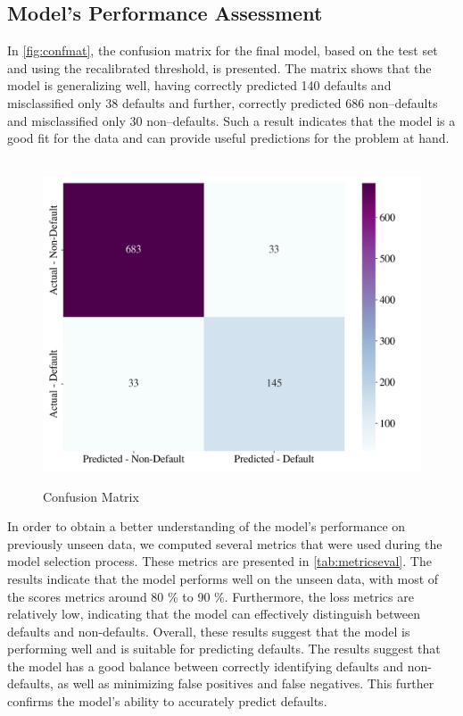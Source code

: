 \subsection{Model's Performance Assessment}
\label{subsec:modelperformance}



In \autoref{fig:confmat}, the confusion matrix for the final model, based on the test set and using the recalibrated threshold, is presented. The matrix shows that the model is generalizing well, having correctly predicted 140 defaults and misclassified only 38 defaults and further, correctly predicted 686 non--defaults and misclassified only 30 non--defaults. Such a result indicates that the model is a good fit for the data and can provide useful predictions for the problem at hand.

\begin{figure}[H]
\centering
\caption{Confusion Matrix}\vspace{0.5em}
\label{fig:confmat}\
\includegraphics[width=130mm]{Figures/Confusion_Matrix.jpg}
\vspace{-1em}
\end{figure}

In order to obtain a better understanding of the model's performance on previously unseen data, we computed several metrics that were used during the model selection process.
These metrics are presented in \autoref{tab:metricseval}. The results indicate that the model performs well on the unseen data, with most of the scores metrics around 80 \% to 90 \%.
Furthermore, the loss metrics are relatively low, indicating that the model can effectively distinguish between defaults and non-defaults.
Overall, these results suggest that the model is performing well and is suitable for predicting defaults.
The results suggest that the model has a good balance between correctly identifying defaults and non-defaults, as well as minimizing false positives and false negatives. This further confirms the model's ability to accurately predict defaults.

